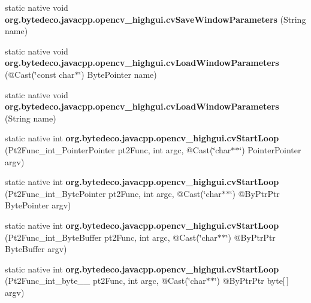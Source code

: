 \begin{DoxyCompactItemize}
static native void {\bfseries org.\+bytedeco.\+javacpp.\+opencv\+\_\+highgui.\+cv\+Save\+Window\+Parameters} (String name)
\item 
\mbox{\label{group__highgui__c_gaa1f79b71a312aad19505a4dc714045c2}} 
static native void {\bfseries org.\+bytedeco.\+javacpp.\+opencv\+\_\+highgui.\+cv\+Load\+Window\+Parameters} (@Cast(\char`\"{}const char$\ast$\char`\"{}) Byte\+Pointer name)
\item 
\mbox{\label{group__highgui__c_ga3635fb46c1653be2888a471d533dc5a5}} 
static native void {\bfseries org.\+bytedeco.\+javacpp.\+opencv\+\_\+highgui.\+cv\+Load\+Window\+Parameters} (String name)
\item 
\mbox{\label{group__highgui__c_gab05449bd84afae67ffea115ad3e02404}} 
static native int {\bfseries org.\+bytedeco.\+javacpp.\+opencv\+\_\+highgui.\+cv\+Start\+Loop} (Pt2\+Func\+\_\+int\+\_\+\+Pointer\+Pointer pt2\+Func, int argc, @Cast(\char`\"{}char$\ast$$\ast$\char`\"{}) Pointer\+Pointer argv)
\item 
\mbox{\label{group__highgui__c_ga275cab30849ad21d136f319fb1225a13}} 
static native int {\bfseries org.\+bytedeco.\+javacpp.\+opencv\+\_\+highgui.\+cv\+Start\+Loop} (Pt2\+Func\+\_\+int\+\_\+\+Byte\+Pointer pt2\+Func, int argc, @Cast(\char`\"{}char$\ast$$\ast$\char`\"{}) @By\+Ptr\+Ptr Byte\+Pointer argv)
\item 
\mbox{\label{group__highgui__c_ga2dbf2d9ec08c08f8ed0ce9f3c1248d49}} 
static native int {\bfseries org.\+bytedeco.\+javacpp.\+opencv\+\_\+highgui.\+cv\+Start\+Loop} (Pt2\+Func\+\_\+int\+\_\+\+Byte\+Buffer pt2\+Func, int argc, @Cast(\char`\"{}char$\ast$$\ast$\char`\"{}) @By\+Ptr\+Ptr Byte\+Buffer argv)
\item 
\mbox{\label{group__highgui__c_gaf06e2c98e14e4223c9e4ccc74882903f}} 
static native int {\bfseries org.\+bytedeco.\+javacpp.\+opencv\+\_\+highgui.\+cv\+Start\+Loop} (Pt2\+Func\+\_\+int\+\_\+byte\+\_\+\+\_\+ pt2\+Func, int argc, @Cast(\char`\"{}char$\ast$$\ast$\char`\"{}) @By\+Ptr\+Ptr byte\mbox{[}$\,$\mbox{]} argv)
\item 
\mbox{\label{group__highgui__c_ga8d069e867b993ee75607afa9cdc986d6}} 

\end{DoxyCompactItemize}
